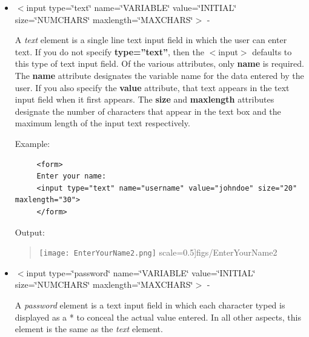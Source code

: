 \begin{itemize}
\item $<$input type=\char`\"{}text\char`\"{} name=\char`\"{}VARIABLE\char`\"{}
value=\char`\"{}INITIAL\char`\"{} size=\char`\"{}NUMCHARS\char`\"{}
maxlength=\char`\"{}MAXCHARS\char`\"{}$>$ - 


A \textit{text} element is a single line text input field in which
the user can enter text. If you do not specify \textbf{type=''text''},
then the $<$input$>$ defaults to this type of text input field. Of the
various attributes, only \textbf{name} is required. The \textbf{name}
attribute designates the variable name for the data entered by the
user. If you also specify the \textbf{value} attribute, that text
appears in the text input field when it first appears. The \textbf{size}
and \textbf{maxlength} attributes designate the number of characters
that appear in the text box and the maximum length of the input text
respectively.

Example:

\begin{footnotesize}
\begin{verbatim}
     <form> 
     Enter your name: 
     <input type="text" name="username" value="johndoe" size="20" maxlength="30"> 
     </form>
\end{verbatim}
\end{footnotesize}

Output:



\begin{quote}
\texttt{[image: EnterYourName2.png]}
  scale=0.5]{figs/EnterYourName2}
\end{quote}
\item $<$input type=\char`\"{}password\char`\"{} name=\char`\"{}VARIABLE\char`\"{}
value=\char`\"{}INITIAL\char`\"{} size=\char`\"{}NUMCHARS\char`\"{}
maxlength=\char`\"{}MAXCHARS\char`\"{}$>$ -


A \textit{password} element is a text input field in which each character
typed is displayed as a {*} to conceal the actual value entered. In
all other aspects, this element is the same as the \textit{text} element.


\end{itemize}
